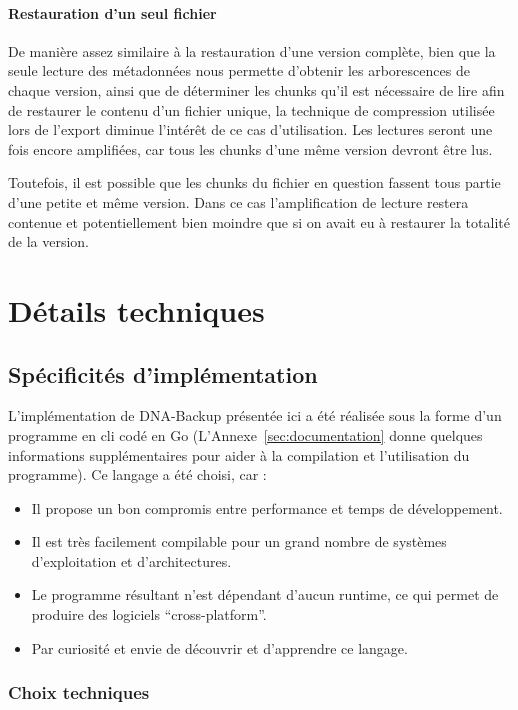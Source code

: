 \documentclass[a4paper]{report}
\begin{document}
\subsubsection{Restauration d'un seul fichier}

De manière assez similaire à la restauration d'une version complète,
bien que la seule lecture des métadonnées nous permette d'obtenir les arborescences de chaque version,
ainsi que de déterminer les chunks qu'il est nécessaire de lire
afin de restaurer le contenu d'un fichier unique,
la technique de compression utilisée lors de l'export diminue l'intérêt de ce cas d'utilisation.
Les lectures seront une fois encore amplifiées, car tous les chunks d'une même version devront être lus.

Toutefois, il est possible que les chunks du fichier en question fassent tous partie d'une petite et même version.
Dans ce cas l'amplification de lecture restera contenue
et potentiellement bien moindre que si on avait eu à restaurer la totalité de la version.


\chapter{Détails techniques}

\section{Spécificités d'implémentation}

L'implémentation de DNA-Backup présentée ici a été réalisée sous la forme d'un programme en \ac{cli} codé en Go
(L'Annexe~\ref{sec:documentation} donne quelques informations supplémentaires pour aider à la compilation et l'utilisation du programme).
Ce langage a été choisi, car :
\begin{itemize}
  \item Il propose un bon compromis entre performance et temps de développement.
  \item Il est très facilement compilable pour un grand nombre de systèmes d'exploitation et d'architectures.
  \item Le programme résultant n'est dépendant d'aucun runtime, ce qui permet de produire des logiciels ``cross-platform''.
  \item Par curiosité et envie de découvrir et d'apprendre ce langage.
\end{itemize}

\subsection{Choix techniques}
\end{document}
